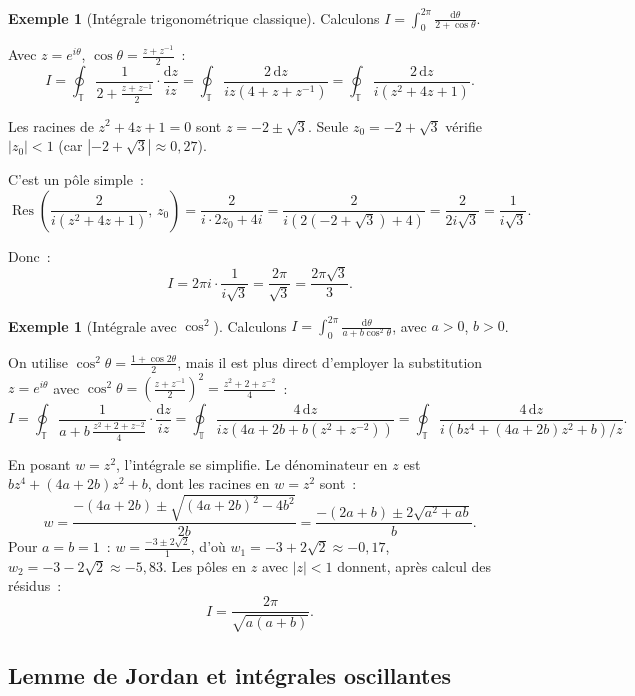 \documentclass[12pt,a4paper,openany]{book}
\theoremstyle{definition}
\newtheorem{exemple}[definition]{Exemple}
\theoremstyle{plain}
\theoremstyle{remark}
\newcommand{\T}{\mathbb{T}}
\DeclareMathOperator{\Res}{Res}
\newcommand{\dd}{\mathrm{d}}
\newcommand{\abs}[1]{\left|#1\right|}
\begin{document}
\begin{exemple}[Intégrale trigonométrique classique]\label{ex:int-trig-1}
Calculons $\displaystyle I = \int_0^{2\pi} \frac{\dd\theta}{2 + \cos\theta}$.

Avec $z = e^{i\theta}$, $\cos\theta = \frac{z + z^{-1}}{2}$~:
\[
  I = \oint_{\T} \frac{1}{2 + \frac{z+z^{-1}}{2}} \cdot \frac{\dd z}{iz}
  = \oint_{\T} \frac{2\, \dd z}{iz(4 + z + z^{-1})}
  = \oint_{\T} \frac{2\, \dd z}{i(z^2 + 4z + 1)}.
\]

Les racines de $z^2 + 4z + 1 = 0$ sont $z = -2 \pm \sqrt{3}$.
Seule $z_0 = -2 + \sqrt{3}$ vérifie $\abs{z_0} < 1$ (car $\abs{-2+\sqrt{3}} \approx 0{,}27$).

C'est un pôle simple~:
\[
  \Res\!\left(\frac{2}{i(z^2+4z+1)},\, z_0\right)
  = \frac{2}{i \cdot 2z_0 + 4i} = \frac{2}{i(2(-2+\sqrt{3})+4)} = \frac{2}{2i\sqrt{3}} = \frac{1}{i\sqrt{3}}.
\]

Donc~:
\[
  I = 2\pi i \cdot \frac{1}{i\sqrt{3}} = \frac{2\pi}{\sqrt{3}} = \frac{2\pi\sqrt{3}}{3}.
\]
\end{exemple}

\begin{exemple}[Intégrale avec $\cos^2$]\label{ex:int-trig-2}
Calculons $\displaystyle I = \int_0^{2\pi} \frac{\dd\theta}{a + b\cos^2\theta}$,
avec $a > 0$, $b > 0$.

On utilise $\cos^2\theta = \frac{1+\cos 2\theta}{2}$, mais il est plus direct
d'employer la substitution $z = e^{i\theta}$ avec
$\cos^2\theta = \left(\frac{z+z^{-1}}{2}\right)^2 = \frac{z^2 + 2 + z^{-2}}{4}$~:
\[
  I = \oint_{\T} \frac{1}{a + b\,\frac{z^2+2+z^{-2}}{4}} \cdot \frac{\dd z}{iz}
  = \oint_{\T} \frac{4\,\dd z}{iz(4a+2b+b(z^2+z^{-2}))}
  = \oint_{\T} \frac{4\,\dd z}{i(bz^4 + (4a+2b)z^2 + b) / z}.
\]

En posant $w = z^2$, l'intégrale se simplifie. Le dénominateur en $z$ est
$bz^4 + (4a+2b)z^2 + b$, dont les racines en $w = z^2$ sont~:
\[
  w = \frac{-(4a+2b) \pm \sqrt{(4a+2b)^2 - 4b^2}}{2b}
  = \frac{-(2a+b) \pm 2\sqrt{a^2+ab}}{b}.
\]
Pour $a = b = 1$~: $w = \frac{-3 \pm 2\sqrt{2}}{1}$, d'où $w_1 = -3 + 2\sqrt{2} \approx -0{,}17$,
$w_2 = -3 - 2\sqrt{2} \approx -5{,}83$. Les pôles en $z$ avec $\abs{z} < 1$
donnent, après calcul des résidus~:
\[
  I = \frac{2\pi}{\sqrt{a(a+b)}}.
\]
\end{exemple}

\subsection{Lemme de Jordan et intégrales oscillantes}\label{subsec:jordan}
\end{document}
